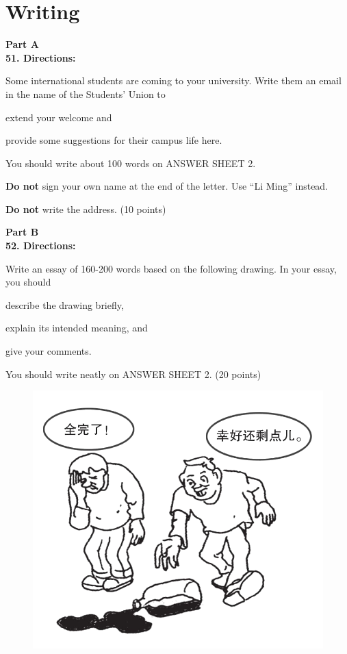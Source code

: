 \newpage


\section{Writing}


\noindent
\textbf{Part A}\\
\textbf{51. Directions:}

Some international students are coming to your university. Write them an
email in the name of the Students' Union to
\begin{listwrite}
	\item
 extend your welcome and

\item 
provide some suggestions for their campus life here.
\end{listwrite}


You should write about 100 words on ANSWER SHEET 2.

\textbf{Do not} sign your own name at the end of the letter. Use ``Li
Ming'' instead.

\textbf{Do not} write the address. (10 points)


\vspace{2em}

\noindent
\textbf{Part B}\\
\textbf{52. Directions:}

Write an essay of 160-200 words based on the following drawing. In your
essay, you should
\begin{listwrite}
	\item
describe the drawing briefly,

\item 
explain its intended meaning, and

\item 
 give your comments.
\end{listwrite}

You should write neatly on ANSWER SHEET 2. (20 points)



\begin{figure}[h!]
	\centering
	\includegraphics[width=0.45\linewidth]{picture/2012.png}
\end{figure}



